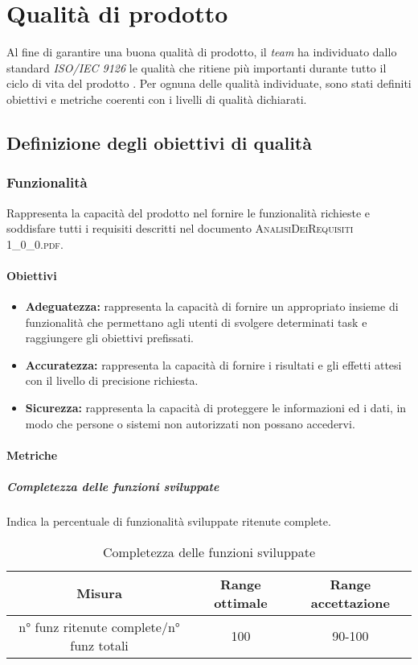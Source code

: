 \newpage
\section{Qualità di prodotto}
	
Al fine di garantire una buona qualità di prodotto, il \textit{team} ha individuato dallo standard \textit{ISO/IEC 9126} le qualità che ritiene più importanti durante tutto il ciclo di vita del prodotto \progetto. Per ognuna delle qualità individuate, sono stati definiti obiettivi e metriche coerenti con i livelli di qualità dichiarati.

\subsection{Definizione degli obiettivi di qualità}

	\subsubsection{Funzionalità}
	Rappresenta la capacità del prodotto nel fornire le funzionalità richieste e soddisfare tutti i requisiti descritti nel documento \textsc{AnalisiDeiRequisiti 1\_0\_0.pdf}.
		
		\paragraph{Obiettivi}
			\begin{itemize}
				\item \textbf{Adeguatezza:} rappresenta la capacità di fornire un appropriato insieme di funzionalità che permettano agli utenti di svolgere determinati task e raggiungere gli obiettivi prefissati.
				\item \textbf{Accuratezza:} rappresenta la capacità di fornire i risultati e gli effetti attesi con il livello di precisione richiesta.
				\item \textbf{Sicurezza:} rappresenta la capacità di proteggere le informazioni ed i dati, in modo che persone o sistemi non autorizzati non possano accedervi.
			\end{itemize}
		
		\paragraph{Metriche}
			\subparagraph{Completezza delle funzioni sviluppate}
			Indica la percentuale di funzionalità sviluppate ritenute complete.
				\begin{table}[H]
					\begin{center}
						\begin{tabular}{|c|c|c|}
							\hline
							\textbf{Misura} & \textbf{Range ottimale} & \textbf{Range accettazione} \\
							\hline
							n° funz ritenute complete/n° funz totali & 100 & 90-100 \\
							\hline
						\end{tabular}
					\end{center}
					\caption{Completezza delle funzioni sviluppate}
				\end{table}
			
